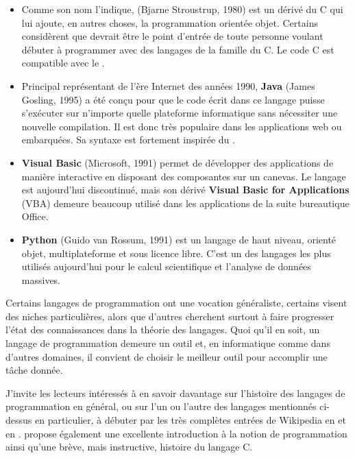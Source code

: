 \begin{itemize}
\item Comme son nom l'indique, \textbf{\Cpp} (Bjarne
  Stroustrup, 1980) est un dérivé du C qui lui ajoute, en autres
  choses, la programmation orientée objet. Certains considèrent que
  {\Cpp} devrait être le point d'entrée de toute personne voulant
  débuter à programmer avec des langages de la famille du C. Le code C
  est compatible avec le \Cpp.
\item Principal représentant de l'ère Internet des années 1990,
  \textbf{Java} (James Gosling, 1995) a été conçu pour
  que le code écrit dans ce langage puisse s'exécuter sur n'importe
  quelle plateforme informatique sans nécessiter une nouvelle
  compilation. Il est donc très populaire dans les applications web ou
  embarquées. Sa syntaxe est fortement inspirée du \Cpp.
\item {}\textbf{Visual Basic} (Microsoft, 1991) permet de développer des
  applications de manière interactive en disposant des composantes sur
  un canevas. Le langage est aujourd'hui discontinué, mais son dérivé
  \textbf{Visual Basic for Applications} (VBA) demeure beaucoup
  utilisé dans les applications de la suite bureautique Office.
\item {}\textbf{Python} (Guido van Rossum, 1991) est un
  langage de haut niveau, orienté objet, multiplateforme et sous
  licence libre. C'est un des langages les plus utilisés aujourd'hui
  pour le calcul scientifique et l'analyse de données massives.
\end{itemize}

Certains langages de programmation ont une vocation généraliste,
certains visent des niches particulières, alors que d'autres cherchent
surtout à faire progresser l'état des connaissances dans la théorie
des langages. Quoi qu'il en soit, un langage de programmation demeure
un outil et, en informatique comme dans d'autres domaines, il convient
de choisir le meilleur outil pour accomplir une tâche donnée.

J'invite les lecteurs intéressés à en savoir davantage sur
l'histoire des langages de programmation en général, ou sur l'un ou
l'autre des langages mentionnés ci-dessus en particulier, à débuter
par les très complètes entrées de Wikipedia en
et en
.
\citet[chapitre~2]{Oualline:C:1997} propose également une excellente
introduction à la notion de programmation ainsi qu'une brève, mais
instructive, histoire du langage C.



